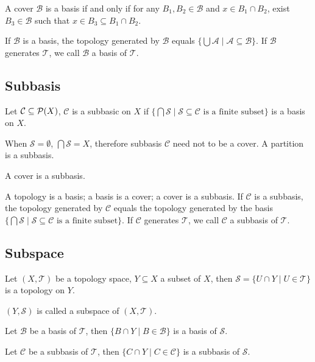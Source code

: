 \begin{pro}
A cover $\mathcal{B}$ is a basis if and only if
for any $B_1, B_2 \in \mathcal{B}$ and $x \in B_1 \cap B_2$,
exist $B_3 \in \mathcal{B}$ such that $x \in B_3 \subseteq B_1 \cap B_2$.
\end{pro}
If $\mathcal{B}$ is a basis, the topology generated by $\mathcal{B}$
equals $\{\bigcup \mathcal{A} \mid \mathcal{A} \subseteq \mathcal{B}\}$.
If $\mathcal{B}$ generates $\mathcal{T}$, we call $\mathcal{B}$ a basis of $\mathcal{T}$.

\subsection{Subbasis}
\begin{defi}
Let $\mathcal{C} \subseteq \mathcal{P}(X)$, $\mathcal{C}$ is a subbasic on $X$
if $\{\bigcap \mathcal{S} \mid \mathcal{S} \subseteq \mathcal{C}\mbox{ is a finite subset}\}$
is a basis on $X$.
\end{defi}
When $\mathcal{S} = \emptyset$, $\bigcap \mathcal{S} = X$,
therefore subbasis $\mathcal{C}$ need not to be a cover.
A partition is a subbasis.

\begin{pro}
A cover is a subbasis.
\end{pro}
A topology is a basis; a basis is a cover; a cover is a subbasis.
If $\mathcal{C}$ is a subbasis, the topology generated by $\mathcal{C}$
equals the topology generated by the basis
$\{\bigcap \mathcal{S} \mid \mathcal{S} \subseteq \mathcal{C}\mbox{ is a finite subset}\}$.
If $\mathcal{C}$ generates $\mathcal{T}$, we call $\mathcal{C}$ a subbasis of $\mathcal{T}$.

\subsection{Subspace}
\begin{pro}
Let $(X, \mathcal{T})$ be a topology space, $Y \subseteq X$ a subset of $X$,
then $\mathcal{S} = \{U \cap Y \mid U \in \mathcal{T}\}$ is a topology on $Y$.
\end{pro}
$(Y, \mathcal{S})$ is called a subspace of $(X, \mathcal{T})$.

\begin{pro}
Let $\mathcal{B}$ be a basis of $\mathcal{T}$,
then $\{B \cap Y \mid B \in \mathcal{B}\}$ is a basis of $\mathcal{S}$.
\end{pro}
\begin{pro}
Let $\mathcal{C}$ be a subbasis of $\mathcal{T}$,
then $\{C \cap Y \mid C \in \mathcal{C}\}$ is a subbasis of $\mathcal{S}$.
\end{pro}


